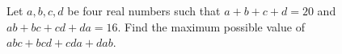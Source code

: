 Let $a,b,c,d$ be four real numbers such that $a+b+c+d=20$ and $ab+bc+cd+da=16$. Find the maximum possible value of $abc+bcd+cda+dab$.
